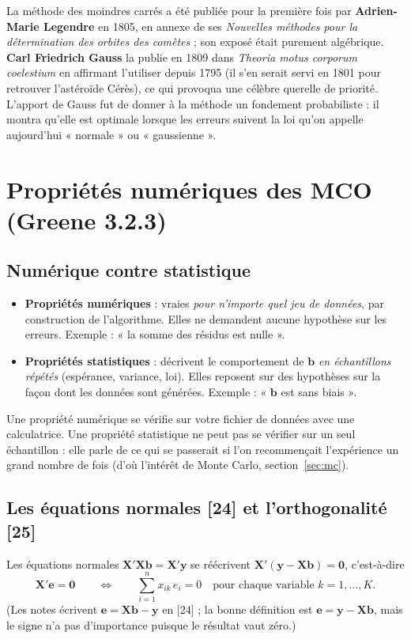 \documentclass[11pt,a4paper]{article}
\newcommand{\vy}{\mathbf{y}}
\newcommand{\vX}{\mathbf{X}}
\newcommand{\ve}{\mathbf{e}}
\newcommand{\vb}{\mathbf{b}}
\newcommand{\XtX}{\vX'\vX}
\newcommand{\sumi}{\sum_{i=1}^{n}}
\begin{document}
\begin{histoire}
La méthode des moindres carrés a été publiée pour la première fois par \textbf{Adrien-Marie Legendre} en 1805, en annexe de ses \emph{Nouvelles méthodes pour la détermination des orbites des comètes} ; son exposé était purement algébrique. \textbf{Carl Friedrich Gauss} la publie en 1809 dans \emph{Theoria motus corporum coelestium} en affirmant l'utiliser depuis 1795 (il s'en serait servi en 1801 pour retrouver l'astéroïde Cérès), ce qui provoqua une célèbre querelle de priorité. L'apport de Gauss fut de donner à la méthode un fondement probabiliste : il montra qu'elle est optimale lorsque les erreurs suivent la loi qu'on appelle aujourd'hui « normale » ou « gaussienne ».
\end{histoire}

\section{Propriétés numériques des MCO (Greene 3.2.3)}

\subsection{Numérique contre statistique}
\begin{itemize}
\item \textbf{Propriétés numériques} : vraies \emph{pour n'importe quel jeu de données}, par construction de l'algorithme. Elles ne demandent aucune hypothèse sur les erreurs. Exemple : « la somme des résidus est nulle ».
\item \textbf{Propriétés statistiques} : décrivent le comportement de $\vb$ \emph{en échantillons répétés} (espérance, variance, loi). Elles reposent sur des hypothèses sur la façon dont les données sont générées. Exemple : « $\vb$ est sans biais ».
\end{itemize}
\begin{intuition}
Une propriété numérique se vérifie sur votre fichier de données avec une calculatrice. Une propriété statistique ne peut pas se vérifier sur un seul échantillon : elle parle de ce qui se passerait si l'on recommençait l'expérience un grand nombre de fois (d'où l'intérêt de Monte Carlo, section~\ref{sec:mc}).
\end{intuition}

\subsection{Les équations normales [24] et l'orthogonalité [25]}
Les équations normales $\XtX\vb=\vX'\vy$ se réécrivent $\vX'(\vy-\vX\vb)=\mathbf 0$, c'est-à-dire
\[
\boxed{\vX'\ve=\mathbf 0}\qquad\Longleftrightarrow\qquad \sumi x_{ik}\,e_i=0\quad\text{pour chaque variable }k=1,\dots,K.
\]
(Les notes écrivent $\ve=\vX\vb-\vy$ en [24] ; la bonne définition est $\ve=\vy-\vX\vb$, mais le signe n'a pas d'importance puisque le résultat vaut zéro.)
\end{document}
